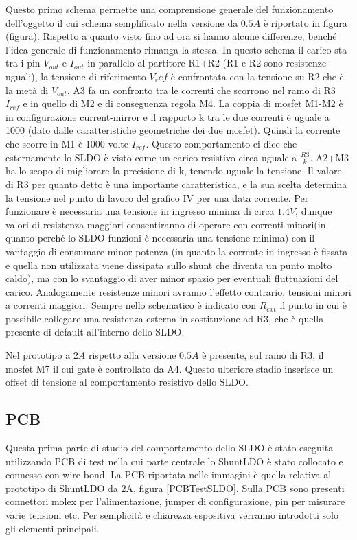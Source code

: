 Questo primo schema permette una comprensione generale del funzionamento dell'oggetto il cui schema semplificato nella versione da $0.5 A$ è riportato in figura (figura). Rispetto a quanto visto fino ad ora si hanno alcune differenze, benché l'idea generale di funzionamento rimanga la stessa. In questo schema il carico sta tra i pin $V_{out}$ e $I_{out}$ in parallelo al partitore R1+R2 (R1 e R2 sono resistenze uguali), la tensione di riferimento $V_ref$ è confrontata con la tensione su R2 che è la metà di $V_{out}$. A3 fa un confronto tra le correnti che scorrono nel ramo di R3 $I_{ref}$ e in quello di M2 e di conseguenza regola M4. La coppia di mosfet M1-M2 è in configurazione current-mirror e il rapporto k tra le due correnti è uguale a 1000 (dato dalle caratteristiche geometriche dei due mosfet). Quindi la corrente che scorre in M1 è 1000 volte $I_{ref}$. Questo comportamento ci dice che esternamente lo SLDO è visto come un carico resistivo circa uguale a $\frac{R3}{k}$. A2+M3 ha lo scopo di migliorare la precisione di k, tenendo uguale la tensione. Il valore di R3 per quanto detto è una importante caratteristica, e la sua scelta determina la tensione nel punto di lavoro del grafico IV per una data corrente. Per funzionare è necessaria una tensione in ingresso minima di circa $1.4V$, dunque valori di resistenza maggiori consentiranno di operare con correnti minori(in quanto perché lo SLDO funzioni è necessaria una tensione minima) con il vantaggio di consumare minor potenza (in quanto la corrente in ingresso è fissata e quella non utilizzata viene dissipata sullo shunt che diventa un punto molto caldo), ma con lo svantaggio di aver minor spazio per eventuali fluttuazioni del carico. Analogamente resistenze minori avranno l'effetto contrario, tensioni minori a correnti maggiori.
Sempre nello schematico è indicato con $R_{ext}$ il punto in cui è possibile collegare una resistenza esterna in sostituzione ad R3, che è quella presente di default all'interno dello SLDO.

Nel prototipo a $2A$ rispetto alla versione $0.5A$ è presente, sul ramo di R3, il mosfet M7 il cui gate è controllato da A4. Questo ulteriore stadio inserisce un offset di tensione al comportamento resistivo dello SLDO.

\subsection{PCB}
Questa prima parte di studio del comportamento dello SLDO è stato eseguita utilizzando PCB di test nella cui parte centrale lo ShuntLDO è stato collocato e connesso con wire-bond. La PCB riportata nelle immagini è quella relativa al prototipo di ShuntLDO da 2A, figura \ref{PCBTestSLDO}. Sulla PCB sono presenti connettori molex per l'alimentazione, jumper di configurazione, pin per misurare varie tensioni etc. Per semplicità e chiarezza espositiva verranno introdotti solo gli elementi principali.

